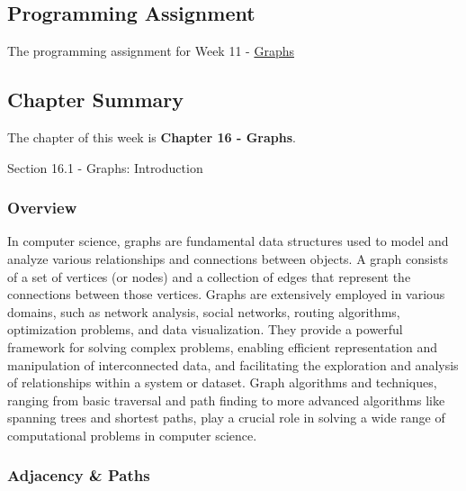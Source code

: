 \subsection{Programming Assignment}

The programming assignment for Week 11 - \href{https://github.com/QuantumCompiler/CU/tree/main/CSPB%202270%20-%20Data%20Structures/CSPB%202270%20-%20Programming%20Assignments/CSPB%202270%20-%20Assignment%209%20-%20Graphs}{Graphs}

\subsection{Chapter Summary}

The chapter of this week is \textbf{Chapter 16 - Graphs}.

\begin{notes}{Section 16.1 - Graphs: Introduction}
    \subsubsection*{Overview}

    In computer science, graphs are fundamental data structures used to model and analyze various relationships and connections between objects. A graph consists of a set of vertices (or nodes) and a 
    collection of edges that represent the connections between those vertices. Graphs are extensively employed in various domains, such as network analysis, social networks, routing algorithms, 
    optimization problems, and data visualization. They provide a powerful framework for solving complex problems, enabling efficient representation and manipulation of interconnected data, and 
    facilitating the exploration and analysis of relationships within a system or dataset. Graph algorithms and techniques, ranging from basic traversal and path finding to more advanced algorithms like 
    spanning trees and shortest paths, play a crucial role in solving a wide range of computational problems in computer science.
    
    \subsubsection*{Adjacency \& Paths}
    

\end{notes}
